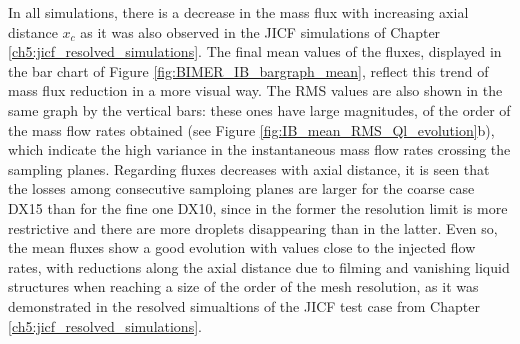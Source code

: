 In all simulations, there is a decrease in the mass flux with increasing axial distance $x_c$ as it was also observed in the JICF simulations of Chapter \ref{ch5:jicf_resolved_simulations}. The final mean values of the fluxes, displayed in the bar chart of Figure \ref{fig:BIMER_IB_bargraph_mean}, reflect this trend of mass flux reduction in a more visual way. The RMS values are also shown in the same graph by the vertical bars: these ones have large magnitudes, of the order of the mass flow rates obtained (see Figure \ref{fig:IB_mean_RMS_Ql_evolution}b), which indicate the high variance in the instantaneous mass flow rates crossing the sampling planes. Regarding fluxes decreases with axial distance, it is seen that the losses among consecutive samploing planes are larger for the coarse case DX15 than for the fine one DX10, since in the former the resolution limit is more restrictive and there are more droplets disappearing than in the latter. Even so, the mean fluxes show a good evolution with values close to the injected flow rates, with reductions along the axial distance due to filming and vanishing liquid structures when reaching a size of the order of the mesh resolution, as it was demonstrated in the resolved simualtions of the JICF test case from Chapter \ref{ch5:jicf_resolved_simulations}.


